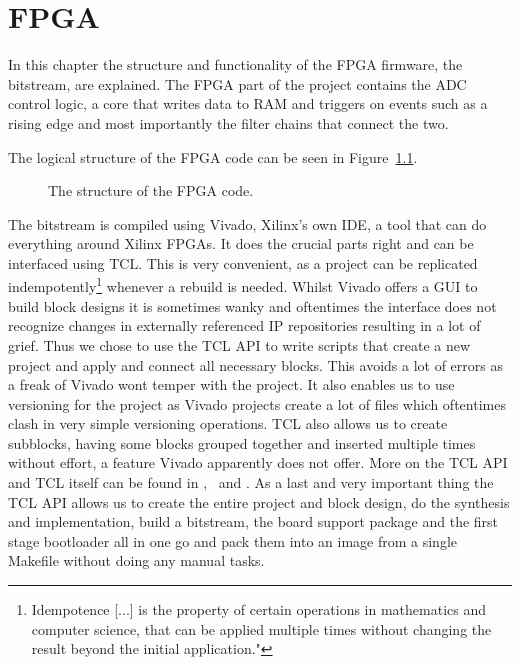 \chapter{FPGA}
\label{ch:fpga}

In this chapter the structure and functionality of the FPGA firmware, the bitstream, are explained.
The FPGA part of the project contains the ADC control logic, a core that writes data to RAM and triggers on events such as a rising edge and most importantly the filter chains that connect the two.

The logical structure of the FPGA code can be seen in Figure~\ref{fig:fpga:structure}.

\begin{figure}
    \centering
    
    \caption{The structure of the FPGA code.}
    \label{fig:fpga:structure}
\end{figure}

The bitstream is compiled using Vivado, Xilinx's own IDE, a tool that can do everything around Xilinx FPGAs. It does the crucial parts right and can be interfaced using TCL. This is very convenient, as a project can be replicated indempotently\footnote{Idempotence [...] is the property of certain operations in mathematics and computer science, that can be applied multiple times without changing the result beyond the initial application.\cite{TODO:https://en.wikipedia.org/wiki/Idempotence}"} whenever a rebuild is needed.
Whilst Vivado offers a GUI to build block designs it is sometimes wanky and oftentimes the interface does not recognize changes in externally referenced IP repositories resulting in a lot of grief. Thus we chose to use the TCL API to write scripts that create a new project and apply and connect all necessary blocks. This avoids a lot of errors as a freak of Vivado wont temper with the project. It also enables us to use versioning for the project as Vivado projects create a lot of files which oftentimes clash in very simple versioning operations.
TCL also allows us to create subblocks, having some blocks grouped together and inserted multiple times without effort, a feature Vivado apparently does not offer.
More on the TCL API and TCL itself can be found in \cite{TODO:vivado tcl},~\cite{TODO: vivado interface} and \cite{TODO:tcl}.
As a last and very important thing the TCL API allows us to create the entire project and block design, do the synthesis and implementation, build a bitstream, the board support package and the first stage bootloader all in one go and pack them into an image from a single Makefile without doing any manual tasks.

